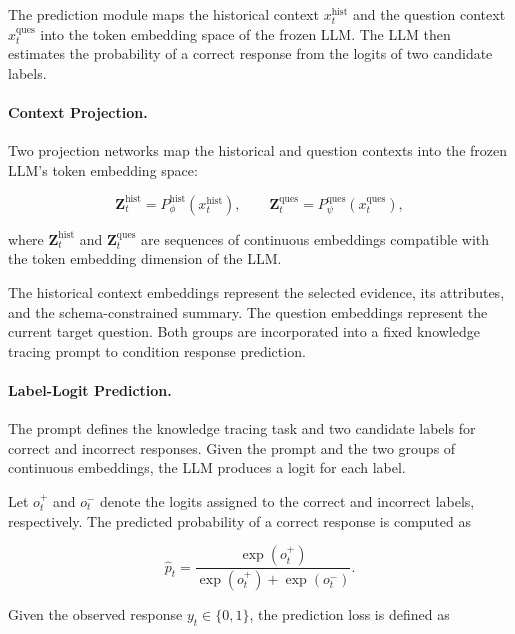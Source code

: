 \documentclass{llncs}
\begin{document}
The prediction module maps the historical context \(x_t^{\mathrm{hist}}\) and the question context \(x_t^{\mathrm{ques}}\) into the token embedding space of the frozen LLM. The LLM then estimates the probability of a correct response from the logits of two candidate labels.

\paragraph{Context Projection.}

Two projection networks map the historical and question contexts into the frozen LLM's token embedding space:

\begin{equation}
\mathbf{Z}_t^{\mathrm{hist}}=P_{\phi}^{\mathrm{hist}}\left(x_t^{\mathrm{hist}}\right),\qquad
\mathbf{Z}_t^{\mathrm{ques}}=P_{\psi}^{\mathrm{ques}}\left(x_t^{\mathrm{ques}}\right),
\end{equation}

where \(\mathbf{Z}_t^{\mathrm{hist}}\) and \(\mathbf{Z}_t^{\mathrm{ques}}\) are sequences of continuous embeddings compatible with the token embedding dimension of the LLM.

The historical context embeddings represent the selected evidence, its attributes, and the schema-constrained summary. The question embeddings represent the current target question. Both groups are incorporated into a fixed knowledge tracing prompt to condition response prediction.

\paragraph{Label-Logit Prediction.}

The prompt defines the knowledge tracing task and two candidate labels for correct and incorrect responses. Given the prompt and the two groups of continuous embeddings, the LLM produces a logit for each label.

Let \(o_t^{+}\) and \(o_t^{-}\) denote the logits assigned to the correct and incorrect labels, respectively. The predicted probability of a correct response is computed as

\begin{equation}
\hat{p}_t=\frac{\exp(o_t^{+})}{\exp(o_t^{+})+\exp(o_t^{-})}.
\end{equation}

Given the observed response \(y_t\in\{0,1\}\), the prediction loss is defined as
\end{document}

